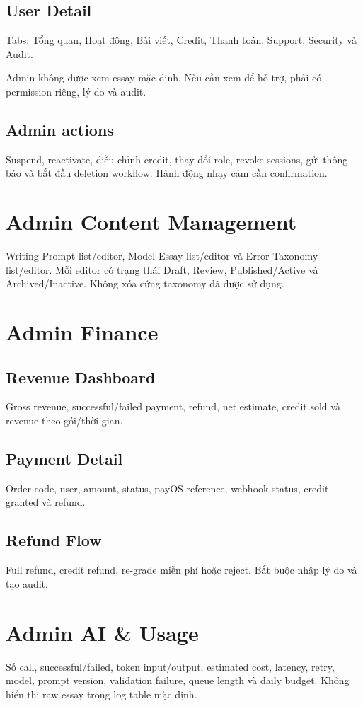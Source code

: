 \documentclass[11pt,a4paper]{article}
\begin{document}
\subsection{User Detail}
Tabs: Tổng quan, Hoạt động, Bài viết, Credit, Thanh toán, Support, Security và Audit.

Admin không được xem essay mặc định. Nếu cần xem để hỗ trợ, phải có permission riêng, lý do và audit.

\subsection{Admin actions}
Suspend, reactivate, điều chỉnh credit, thay đổi role, revoke sessions, gửi thông báo và bắt đầu deletion workflow. Hành động nhạy cảm cần confirmation.

\section{Admin Content Management}
Writing Prompt list/editor, Model Essay list/editor và Error Taxonomy list/editor. Mỗi editor có trạng thái Draft, Review, Published/Active và Archived/Inactive. Không xóa cứng taxonomy đã được sử dụng.

\section{Admin Finance}

\subsection{Revenue Dashboard}
Gross revenue, successful/failed payment, refund, net estimate, credit sold và revenue theo gói/thời gian.

\subsection{Payment Detail}
Order code, user, amount, status, payOS reference, webhook status, credit granted và refund.

\subsection{Refund Flow}
Full refund, credit refund, re-grade miễn phí hoặc reject. Bắt buộc nhập lý do và tạo audit.

\section{Admin AI \& Usage}
Số call, successful/failed, token input/output, estimated cost, latency, retry, model, prompt version, validation failure, queue length và daily budget. Không hiển thị raw essay trong log table mặc định.
\end{document}
